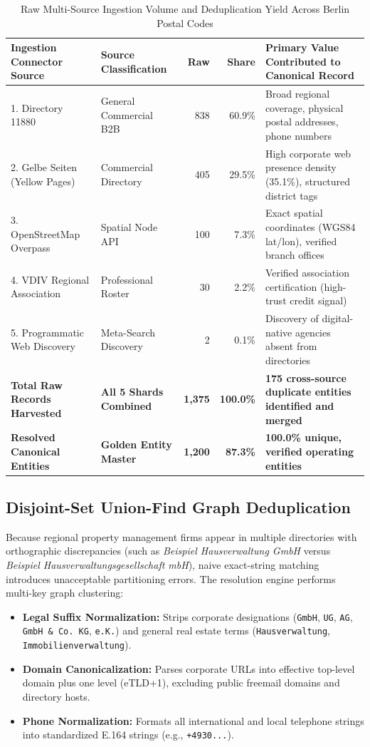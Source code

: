 \documentclass[11pt,a4paper]{article}
\begin{document}
\begin{table}[htbp]
\centering
\caption{Raw Multi-Source Ingestion Volume and Deduplication Yield Across Berlin Postal Codes}
\label{tab:ingestion}
\footnotesize
\begin{tabularx}{\textwidth}{l l r r X}
\toprule
\textbf{Ingestion Connector Source} & \textbf{Source Classification} & \textbf{Raw} & \textbf{Share} & \textbf{Primary Value Contributed to Canonical Record} \\
\midrule
1. Directory 11880 & General Commercial B2B & 838 & 60.9\% & Broad regional coverage, physical postal addresses, phone numbers \\
2. Gelbe Seiten (Yellow Pages) & Commercial Directory & 405 & 29.5\% & High corporate web presence density (35.1\%), structured district tags \\
3. OpenStreetMap Overpass & Spatial Node API & 100 & 7.3\% & Exact spatial coordinates (WGS84 lat/lon), verified branch offices \\
4. VDIV Regional Association & Professional Roster & 30 & 2.2\% & Verified association certification (high-trust credit signal) \\
5. Programmatic Web Discovery & Meta-Search Discovery & 2 & 0.1\% & Discovery of digital-native agencies absent from directories \\
\midrule
\textbf{Total Raw Records Harvested} & \textbf{All 5 Shards Combined} & \textbf{1,375} & \textbf{100.0\%} & \textbf{175 cross-source duplicate entities identified and merged} \\
\textbf{Resolved Canonical Entities} & \textbf{Golden Entity Master} & \textbf{1,200} & \textbf{87.3\%} & \textbf{100.0\% unique, verified operating entities} \\
\bottomrule
\end{tabularx}
\end{table}

\subsection{Disjoint-Set Union-Find Graph Deduplication}
Because regional property management firms appear in multiple directories with orthographic discrepancies (such as \textit{Beispiel Hausverwaltung GmbH} versus \textit{Beispiel Hausverwaltungsgesellschaft mbH}), naive exact-string matching introduces unacceptable partitioning errors. The resolution engine performs multi-key graph clustering:
\begin{itemize}
    \item \textbf{Legal Suffix Normalization:} Strips corporate designations (\texttt{GmbH}, \texttt{UG}, \texttt{AG}, \texttt{GmbH \& Co. KG}, \texttt{e.K.}) and general real estate terms (\texttt{Hausverwaltung}, \texttt{Immobilienverwaltung}).
    \item \textbf{Domain Canonicalization:} Parses corporate URLs into effective top-level domain plus one level (eTLD+1), excluding public freemail domains and directory hosts.
    \item \textbf{Phone Normalization:} Formats all international and local telephone strings into standardized E.164 strings (e.g., \texttt{+4930...}).
\end{itemize}
\end{document}
